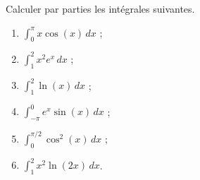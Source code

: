 \begin{exercice}\label{exoTD5-00003}

Calculer par parties les intégrales suivantes.
\begin{enumerate}
\item $\displaystyle \int_0^\pi x\cos(x)\, dx $ ;
  \item $\displaystyle \int_1^2 x^{2}e^x \, dx $ ;
    \item $\displaystyle \int_1^2 \ln(x) \, dx $ ;
      \item $\displaystyle \int_{-\pi}^{0} e^x\sin(x) \, dx $ ;
        \item $\displaystyle \int_{0}^{\pi/2} \cos^2(x) \, dx$ ;
          \item $\displaystyle \int_{1}^{2} x^2\ln(2x) \, dx$.
\end{enumerate}

\end{exercice}
